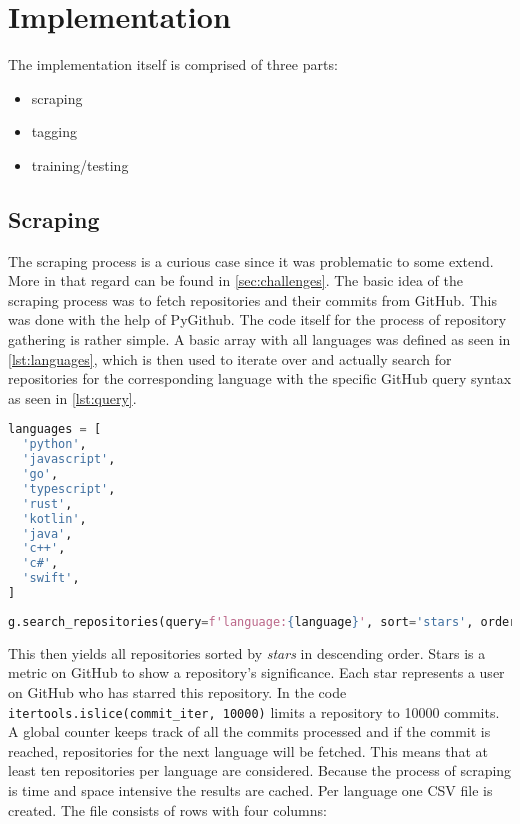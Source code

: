\section{Implementation}
\label{sec:implementation}

The implementation itself is comprised of three parts:

\begin{itemize}
  \item scraping
  \item tagging
  \item training/testing
\end{itemize}

\subsection{Scraping}

The scraping process is a curious case since it was problematic to some extend.
More in that regard can be found in \autoref{sec:challenges}. The basic idea
of the scraping process was to fetch repositories and their commits from
GitHub. This was done with the help of PyGithub. The code itself for the
process of repository gathering is rather simple. A basic array with all
languages was defined as seen in \autoref{lst:languages}, which is then used to
iterate over and actually search for repositories for the corresponding language
with the specific GitHub query syntax as seen in \autoref{lst:query}.

\begin{lstlisting}[language=python, label={lst:languages}, caption={Array of all languages for scraping}]
languages = [
  'python',
  'javascript',
  'go',
  'typescript',
  'rust',
  'kotlin',
  'java',
  'c++',
  'c#',
  'swift',
]
\end{lstlisting}

\begin{lstlisting}[language=python, label={lst:query}, caption={GitHub query syntax}]
g.search_repositories(query=f'language:{language}', sort='stars', order='desc'):
\end{lstlisting}

This then yields all repositories sorted by \textit{stars} in descending order.
Stars is a metric on GitHub to show a repository's significance. Each star
represents a user on GitHub who has starred this repository. In the code
\lstinline{itertools.islice(commit_iter, 10000)} limits a repository to 10000
commits. A global counter keeps track of all the commits processed and if the
 commit is reached, repositories for the next language will
be fetched.  This means that at least ten repositories per language are
considered. Because the process of scraping is time and space intensive the
results are cached. Per language one CSV file is created. The file consists of
rows with four columns:

